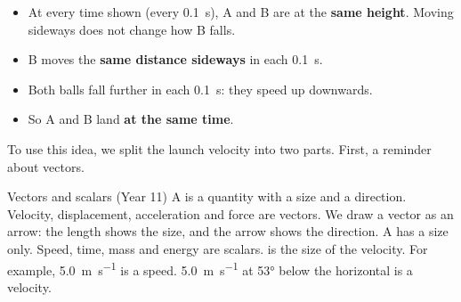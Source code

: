 \begin{sidebyside}[0.47]
  \centering
  \label{ch1:fig:strobe}
\nextside
  \begin{itemize}
    \item At every time shown (every \qty{0.1}{s}), A and B are at the \textbf{same height}.
          Moving sideways does not change how B falls.
    \item B moves the \textbf{same distance sideways} in each \qty{0.1}{s}.
    \item Both balls fall further in each \qty{0.1}{s}: they speed up downwards.
    \item So A and B land \textbf{at the same time}.
  \end{itemize}
\end{sidebyside}

To use this idea, we split the launch velocity into two parts. First, a reminder about
vectors.

\begin{refresher}{Vectors and scalars (Year 11)}
A  is a quantity with a size and a direction. Velocity, displacement,
acceleration and force are vectors. We draw a vector as an arrow: the length shows the size,
and the arrow shows the direction. A  has a size only. Speed, time, mass and
energy are scalars.  is the size of the velocity. For example,
\qty{5.0}{m.s^{-1}} is a speed. \qty{5.0}{m.s^{-1}} at \ang{53} below the horizontal is a
velocity.
\end{refresher}


